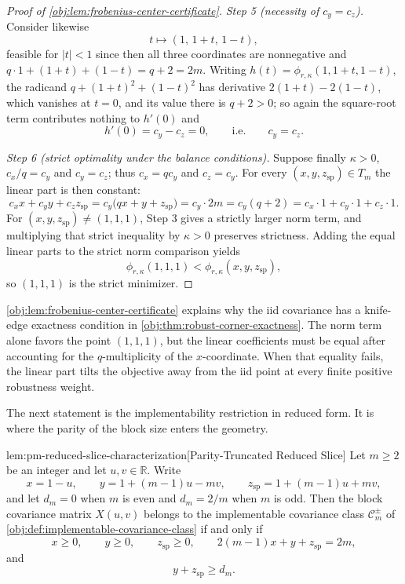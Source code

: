 \documentclass[11pt]{article}
\begin{document}
\begin{proof}[Proof of \cref{obj:lem:frobenius-center-certificate}]
\emph{Step 5 (necessity of \(c_y=c_z\)).}  Consider likewise
\[
t\longmapsto(1,\,1+t,\,1-t),
\]
feasible for \(|t|<1\) since then all three coordinates are nonnegative and \(q\cdot1+(1+t)+(1-t)=q+2=2m\).  Writing \(h(t)=\phi_{r,\kappa}(1,1+t,1-t)\), the radicand \(q+(1+t)^2+(1-t)^2\) has derivative \(2(1+t)-2(1-t)\), which vanishes at \(t=0\), and its value there is \(q+2>0\); so again the square-root term contributes nothing to \(h'(0)\) and
\[
h'(0)=c_y-c_z=0,
\qquad\text{i.e.}\qquad
c_y=c_z .
\]

\emph{Step 6 (strict optimality under the balance conditions).}  Suppose finally \(\kappa>0\), \(c_x/q=c_y\) and \(c_y=c_z\); thus \(c_x=qc_y\) and \(c_z=c_y\).  For every \((x,y,z_{\mathrm{sp}})\in T_m\) the linear part is then constant:
\[
c_xx+c_yy+c_zz_{\mathrm{sp}}
=c_y\bigl(qx+y+z_{\mathrm{sp}}\bigr)
=c_y\cdot 2m
=c_y(q+2)
=c_x\cdot1+c_y\cdot1+c_z\cdot1 .
\]
For \((x,y,z_{\mathrm{sp}})\ne(1,1,1)\), Step 3 gives a strictly larger norm term, and multiplying that strict inequality by \(\kappa>0\) preserves strictness.  Adding the equal linear parts to the strict norm comparison yields
\[
\phi_{r,\kappa}(1,1,1)<\phi_{r,\kappa}(x,y,z_{\mathrm{sp}}),
\]
so \((1,1,1)\) is the strict minimizer. %
\end{proof}

\cref{obj:lem:frobenius-center-certificate} explains why the iid covariance has a knife-edge exactness condition in \cref{obj:thm:robust-corner-exactness}. The norm term alone favors the point \((1,1,1)\), but the linear coefficients must be equal after accounting for the \(q\)-multiplicity of the \(x\)-coordinate. When that equality fails, the linear part tilts the objective away from the iid point at every finite positive robustness weight.

The next statement is the implementability restriction in reduced form. It is where the parity of the block size enters the geometry.

\begin{lemmav}{lem:pm-reduced-slice-characterization}[Parity-Truncated Reduced Slice]
Let \(m\ge 2\) be an integer and let \(u,v\in\mathbb R\). Write
\[
x=1-u,\qquad
y=1+(m-1)u-mv,\qquad
z_{\mathrm{sp}}=1+(m-1)u+mv,
\]
and let \(d_m=0\) when \(m\) is even and \(d_m=2/m\) when \(m\) is odd. Then the block covariance matrix \(X(u,v)\) belongs to the implementable covariance class \(\mathcal C_m^{\pm}\) of \cref{obj:def:implementable-covariance-class} if and only if
\[
x\ge 0,\qquad y\ge 0,\qquad z_{\mathrm{sp}}\ge 0,\qquad
2(m-1)x+y+z_{\mathrm{sp}}=2m,
\]
and
\[
y+z_{\mathrm{sp}}\ge d_m .
\]
\end{lemmav}
\end{document}

